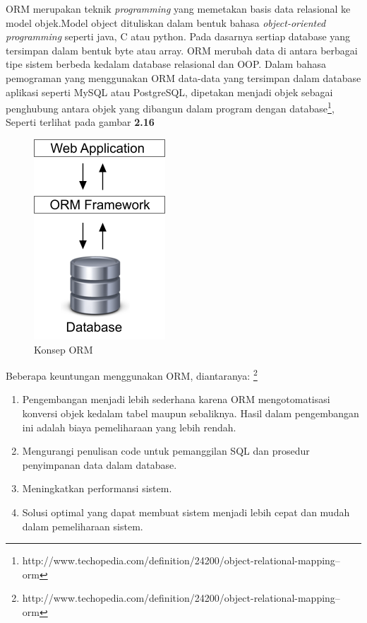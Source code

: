 ORM merupakan teknik \textit{programming} yang memetakan basis data relasional ke model objek.Model object dituliskan dalam bentuk bahasa \textit{object-oriented programming} seperti java, C atau python. Pada dasarnya sertiap database yang tersimpan dalam bentuk byte atau array. ORM merubah data di antara berbagai tipe sistem berbeda kedalam database relasional dan OOP. \cite{Hans:2014} \newline 
	Dalam bahasa pemograman yang menggunakan ORM data-data yang tersimpan dalam database aplikasi seperti MySQL atau PostgreSQL, dipetakan menjadi objek sebagai penghubung antara objek yang dibangun dalam program dengan database\footnote{http://www.techopedia.com/definition/24200/object-relational-mapping--orm}, Seperti terlihat pada gambar \textbf{2.16}
	\begin{figure}[h]
	\centering
	\includegraphics[scale=1]{Gambar/ormFramework}
	\caption{Konsep ORM }
	\end{figure}
	Beberapa keuntungan menggunakan ORM, diantaranya: \footnote{http://www.techopedia.com/definition/24200/object-relational-mapping--orm}
	\begin{enumerate}
		\item Pengembangan menjadi lebih sederhana karena ORM mengotomatisasi konversi objek kedalam tabel maupun sebaliknya. Hasil dalam pengembangan ini adalah biaya pemeliharaan yang lebih rendah.
		\item Mengurangi penulisan code untuk pemanggilan SQL dan prosedur penyimpanan data dalam database.
		\item Meningkatkan performansi sistem.
		\item Solusi optimal yang dapat membuat sistem menjadi lebih cepat dan mudah dalam pemeliharaan sistem.
	\end{enumerate}
	
